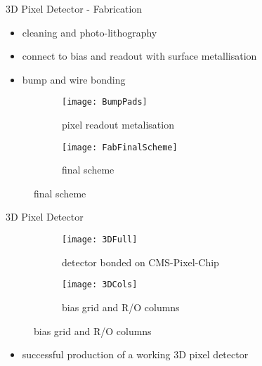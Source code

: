 \begin{frame}{3D Pixel Detector - Fabrication}

	\vspace*{-5pt}
	\begin{itemize}
		\itemfill
		\item cleaning and photo-lithography
		\item connect to bias and readout with surface metallisation
		\item bump and wire bonding
	\end{itemize}
	
	\begin{figure}
		\centering
		\begin{subfigure}{0.45\textwidth}  
			\centering 
			\texttt{[image: BumpPads]}
			\caption{pixel readout metalisation}
		\end{subfigure}
		\hspace*{10pt}
		\begin{subfigure}{0.45\textwidth} 
			\centering 
			\texttt{[image: FabFinalScheme]}
			\caption{final scheme}
		\end{subfigure}
	\end{figure}\vspace*{-15pt}
 	
\end{frame}
\begin{frame}{3D Pixel Detector}
	
	\begin{figure}
		\centering
		\begin{subfigure}{0.45\textwidth}  
			\centering 
			\texttt{[image: 3DFull]}
			\caption{detector bonded on CMS-Pixel-Chip}
		\end{subfigure}
		\begin{subfigure}{0.45\textwidth} 
			\centering 
			\texttt{[image: 3DCols]}
			\caption{bias grid and R/O columns}
		\end{subfigure}
	\end{figure}

	\begin{itemize}
		\itemfill
		\item successful production of a working 3D pixel detector
	\end{itemize}
 	
\end{frame}
